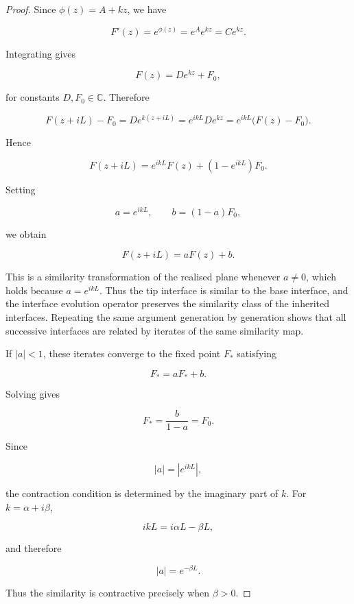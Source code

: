 \documentclass[10pt,a4paper]{amsart}
\begin{document}
\begin{proof}
Since $\phi(z)=A+kz$, we have

\[
    F'(z)=e^{\phi(z)}=e^A e^{kz}=Ce^{kz}.
\]

Integrating gives

\[
    F(z)=De^{kz}+F_0,
\]

for constants $D,F_0\in\mathbb{C}$. Therefore

\[
    F(z+iL)-F_0
    =
    De^{k(z+iL)}
    =
    e^{ikL}De^{kz}
    =
    e^{ikL}\bigl(F(z)-F_0\bigr).
\]

Hence

\[
    F(z+iL)
    =
    e^{ikL}F(z)+(1-e^{ikL})F_0.
\]

Setting

\[
    a=e^{ikL},
    \qquad
    b=(1-a)F_0,
\]

we obtain

\[
    F(z+iL)=aF(z)+b.
\]

This is a similarity transformation of the realised plane whenever
$a\neq 0$, which holds because $a=e^{ikL}$. Thus the tip interface is
similar to the base interface, and the interface evolution operator
preserves the similarity class of the inherited interfaces. Repeating
the same argument generation by generation shows that all successive
interfaces are related by iterates of the same similarity map.

If $|a|<1$, these iterates converge to the fixed point $F_*$ satisfying

\[
    F_*=aF_*+b.
\]

Solving gives

\[
    F_*=\frac{b}{1-a}=F_0.
\]

Since

\[
    |a|=|e^{ikL}|,
\]

the contraction condition is determined by the imaginary part of $k$.
For $k=\alpha+i\beta$,

\[
    ikL=i\alpha L-\beta L,
\]

and therefore

\[
    |a|=e^{-\beta L}.
\]

Thus the similarity is contractive precisely when $\beta>0$.
\end{proof}
\end{document}
